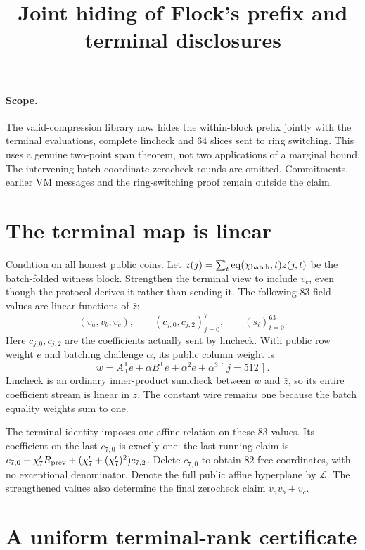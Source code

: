 \documentclass[11pt]{article}
\title{Joint hiding of Flock's prefix and terminal disclosures}
\author{}
\date{}
\begin{document}
\maketitle
\vspace{-2em}

\paragraph{Scope.} The valid-compression library now hides the within-block prefix jointly with the terminal evaluations, complete lincheck and $64$ slices sent to ring switching. This uses a genuine two-point span theorem, not two applications of a marginal bound. The intervening batch-coordinate zerocheck rounds are omitted. Commitments, earlier VM messages and the ring-switching proof remain outside the claim.

\section{The terminal map is linear}

Condition on all honest public coins. Let $\bar z(j)=\sum_t\operatorname{eq}(\chi_{\rm batch},t)z(j,t)$ be the batch-folded witness block. Strengthen the terminal view to include $v_c$, even though the protocol derives it rather than sending it. The following $83$ field values are linear functions of $\bar z$:
\[
 (v_a,v_b,v_c),\qquad
 (c_{j,0},c_{j,2})_{j=0}^{7},\qquad
 (s_i)_{i=0}^{63}.
\]
Here $c_{j,0},c_{j,2}$ are the coefficients actually sent by lincheck. With public row weight $e$ and batching challenge $\alpha$, its public column weight is
\[
 w=A_0^{\mathsf T}e+\alpha B_0^{\mathsf T}e+\alpha^2e+\alpha^3[\,j=512\,].
\]
Lincheck is an ordinary inner-product sumcheck between $w$ and $\bar z$, so its entire coefficient stream is linear in $\bar z$. The constant wire remains one because the batch equality weights sum to one.

The terminal identity imposes one affine relation on these $83$ values. Its coefficient on the last $c_{7,0}$ is exactly one: the last running claim is $c_{7,0}+\chi'_7 R_{\rm prev}+(\chi'_7+(\chi'_7)^2)c_{7,2}$. Delete $c_{7,0}$ to obtain $82$ free coordinates, with no exceptional denominator. Denote the full public affine hyperplane by $\mathcal L$. The strengthened values also determine the final zerocheck claim $v_av_b+v_c$.

\section{A uniform terminal-rank certificate}
\end{document}
